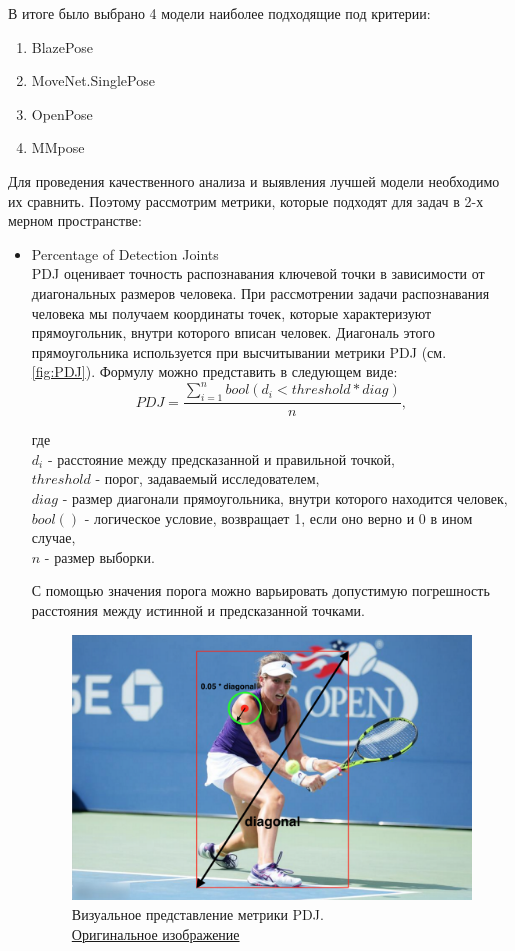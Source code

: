 В итоге было выбрано 4 модели наиболее подходящие под критерии:
\begin{enumerate}
	\item BlazePose
	\item MoveNet.SinglePose
	\item OpenPose
	\item MMpose
\end{enumerate}

Для проведения качественного анализа и выявления лучшей модели необходимо их сравнить. Поэтому рассмотрим метрики, которые подходят для задач в 2-х мерном пространстве:

\begin{itemize}
	\item Percentage of Detection Joints\\
	PDJ оценивает точность распознавания ключевой точки в зависимости от диагональных размеров человека. При рассмотрении задачи распознавания человека мы получаем координаты точек, которые характеризуют прямоугольник, внутри которого вписан человек. Диагональ этого прямоугольника используется при высчитывании метрики PDJ (см. \autoref{fig:PDJ}). Формулу можно представить в следующем виде:
	\begin{equation}
		PDJ = \frac{\sum_{i=1}^{n} bool(d_i < threshold * diag)}{n},
	\end{equation}
	
	где\\
	$d_i$ - расстояние между предсказанной и правильной точкой,\\
	$threshold$ - порог, задаваемый исследователем,\\
	$diag$ - размер диагонали прямоугольника, внутри которого находится человек,\\
	$bool()$ - логическое условие, возвращает 1, если оно верно и 0 в ином случае,\\
	$n$ - размер выборки.
	
	С помощью значения порога можно варьировать допустимую погрешность расстояния между истинной и предсказанной точками.
	\begin{figure}[h]
		\centering
		\includegraphics[width=\textwidth * 4 / 5]{./images/PDJ}
		\caption{Визуальное представление метрики PDJ.\\ \href{hhttps://miro.medium.com/max/1400/1*dJhVudwq7pb_xl3yPEH37Q.jpeg}{Оригинальное изображение}}
		\label{fig:PDJ}
	\end{figure}


\end{itemize}
